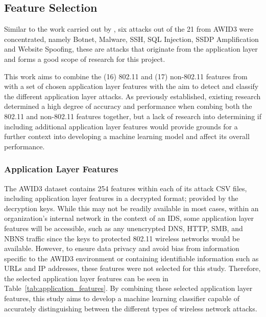

\subsection{Feature Selection}

Similar to the work carried out by \textcite{s22155633}, six attacks out of the 21 from AWID3 were concentrated, namely Botnet, Malware, SSH, SQL Injection, SSDP Amplification and Website Spoofing, these are attacks that originate from the application layer and forms a good scope of research for this project. 

This work aims to combine the (16) 802.11 and (17) non-802.11 features from \cite{s22155633} with a set of chosen application layer features with the aim to detect and classify the different application layer attacks. As previously established, existing research determined a high degree of accuracy and performance when combing both the 802.11 and non-802.11 features together, but a lack of research into determining if including additional application layer features would provide grounds for a further context into developing a machine learning model and affect its overall performance.

\subsubsection{Application Layer Features}

The AWID3 dataset contains 254 features within each of its attack CSV files, including application layer features in a decrypted format; provided by the decryption keys. While this may not be readily available in most cases, within an organization's internal network in the context of an IDS, some application layer features will be accessible, such as any unencrypted DNS, HTTP, SMB, and NBNS traffic since the keys to protected 802.11 wireless networks would be available. However, to ensure data privacy and avoid bias from information specific to the AWID3 environment or containing identifiable information such as URLs and IP addresses, these features were not selected for this study. Therefore, the selected application layer features can be seen in Table~\ref{tab:application_features}. By combining these selected application layer features, this study aims to develop a machine learning classifier capable of accurately distinguishing between the different types of wireless network attacks.

